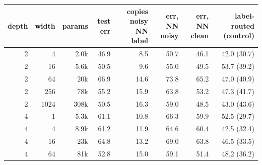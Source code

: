 \begin{tabular}{rrrrrrrr}
\toprule
depth & width & params & test err & copies noisy NN label & err, NN noisy & err, NN clean & label-routed (control) \\
\midrule
2 & 4 & 2.0k & 46.9 & 8.5 & 50.7 & 46.1 & 42.0 (30.7) \\
2 & 16 & 5.6k & 50.5 & 9.6 & 55.0 & 49.5 & 53.7 (39.2) \\
2 & 64 & 20k & 66.9 & 14.6 & 73.8 & 65.2 & 47.0 (40.9) \\
2 & 256 & 78k & 55.2 & 15.9 & 63.8 & 53.2 & 47.3 (41.7) \\
2 & 1024 & 308k & 50.5 & 16.3 & 59.0 & 48.5 & 43.0 (43.6) \\
4 & 1 & 5.3k & 61.1 & 10.8 & 66.3 & 59.9 & 52.5 (29.7) \\
4 & 4 & 8.9k & 61.2 & 11.9 & 64.6 & 60.4 & 42.5 (32.4) \\
4 & 16 & 23k & 64.8 & 13.2 & 69.0 & 63.8 & 46.5 (33.5) \\
4 & 64 & 81k & 52.8 & 15.0 & 59.1 & 51.4 & 48.2 (36.2) \\
\bottomrule
\end{tabular}
